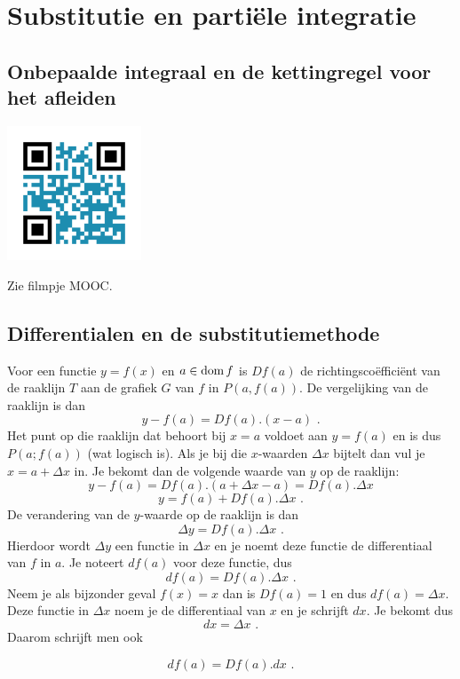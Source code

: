 \section{Substitutie en parti\"ele integratie}

\subsection{Onbepaalde integraal en de kettingregel voor het afleiden}
\begin{minipage}{.25\linewidth}
	\raggedright
	\includegraphics[width=4cm]{6_afgeleiden_integralen/inputs/QR_Code_OPPKETTINGINT_module6_3}
\end{minipage}
\begin{minipage}{.7\linewidth}
	Zie filmpje MOOC.
\end{minipage}


\subsection{Differentialen en de substitutiemethode}

Voor een functie $y=f(x)$ en $a \in \operatorname{dom} f$ is $Df(a)$ de richtingsco\"effici\"ent van de raaklijn $T$ aan de grafiek $G$ van $f$ in $P(a,f(a))$.
De vergelijking van de raaklijn is dan
\[
y-f(a)=Df(a).(x-a) \text { .}
\]
Het punt op die raaklijn dat behoort bij $x=a$ voldoet aan $y=f(a)$ en is dus $P(a;f(a))$ (wat logisch is).
Als je bij die $x$-waarden $\Delta x$ bijtelt dan vul je $x=a+\Delta x$ in.
Je bekomt dan de volgende waarde van $y$ op de raaklijn:
\[
y-f(a)=Df(a).(a+\Delta x -a)=Df(a).\Delta x
\]
\[
y=f(a)+Df(a).\Delta x \text { .}
\]
De verandering van de $y$-waarde op de raaklijn is dan
\[
\Delta y=Df(a).\Delta x \text { .}
\]
Hierdoor wordt $\Delta y$ een functie in $\Delta x$ en je noemt deze functie de differentiaal van $f$ in $a$.
Je noteert  $df(a)$ voor deze functie, dus
\[
df(a)=Df(a).\Delta x \text { .}
\]
Neem je als bijzonder geval $f(x)=x$ dan is $Df(a)=1$ en dus $df(a)=\Delta x$.
Deze functie in $\Delta x$ noem je de differentiaal van $x$ en je schrijft $dx$.
Je bekomt dus
\[
dx=\Delta x \text { .}
\]
Daarom schrijft men ook
\begin{definitie}
	\[
df(a)=Df(a).dx \text { .}
\]
\end{definitie}


